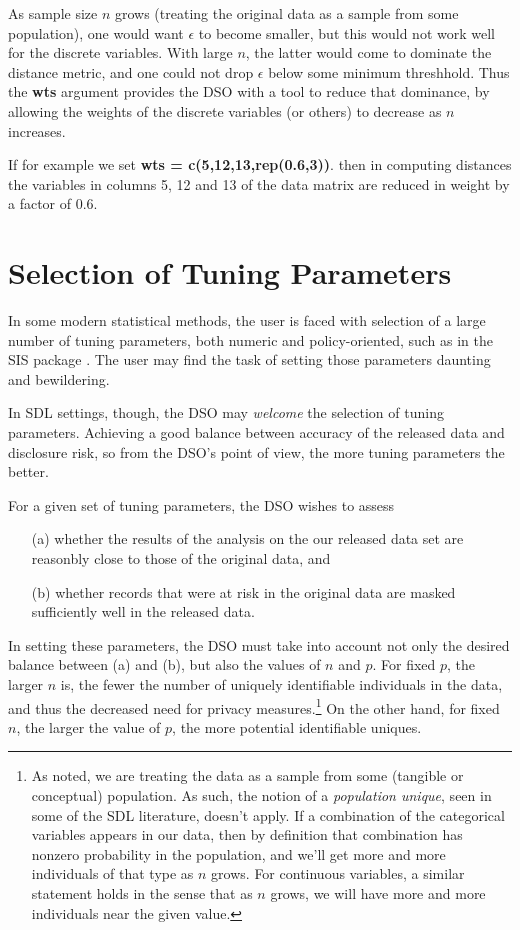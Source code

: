 \documentclass[11pt]{article}
\begin{document}
As sample size $n$ grows (treating the original data as a sample from
some population), one would want $\epsilon$ to become smaller, but this
would not work well for the discrete variables.  With large $n$, the
latter would come to dominate the distance metric, and one could not
drop $\epsilon$ below some minimum threshhold.  Thus the {\bf wts}
argument provides the DSO with a tool to reduce that dominance, by
allowing the weights of the discrete variables (or others) to decrease
as $n$ increases.

If for example we set {\bf wts = c(5,12,13,rep(0.6,3))}. then in
computing distances the variables in columns 5, 12 and 13 of the data
matrix are reduced in weight by a factor of 0.6.  

\section{Selection of Tuning Parameters}

In some modern statistical methods, the user is faced with selection of
a large number of tuning parameters, both numeric and policy-oriented,
such as in the SIS package \cite{fan}.  The user may find the task of
setting those parameters daunting and bewildering.

In SDL settings, though, the DSO may {\it welcome} the selection of
tuning parameters. Achieving a good balance between accuracy of the
released data and disclosure risk, so from the DSO's point of view, the
more tuning parameters the better.

For a given set of tuning parameters, the DSO wishes to assess

\begin{itemize}

\item [(a)]
whether the results of the analysis on the our released data set are
reasonbly close to those of the original data, and 

\item [(b)]
whether records that were at risk in the original data are masked 
sufficiently well in the released data.

\end{itemize}

In setting these parameters, the DSO must take into account not only the
desired balance between (a) and (b), but also the values of $n$ and $p$.
For fixed $p$, the larger $n$ is, the fewer the number of uniquely
identifiable individuals in the data, and thus the decreased need for
privacy measures.\footnote{As noted, we are treating the data as a
sample from some (tangible or conceptual) population.  As such, the
notion of a {\it population unique}, seen in some of the SDL literature,
doesn't apply.  If a combination of the categorical variables appears in
our data, then by definition that combination has nonzero probability in
the population, and we'll get more and more individuals of that type as
$n$ grows.  For continuous variables, a similar statement holds in the
sense that as $n$ grows, we will have more and more individuals near the
given value.} On the other hand, for fixed $n$, the larger the value of
$p$, the more potential identifiable uniques.
\end{document}
